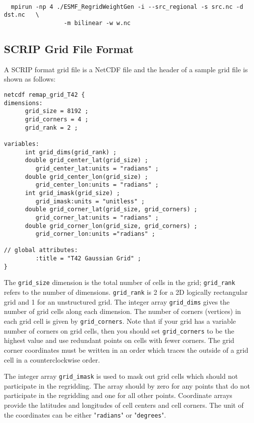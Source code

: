\begin{verbatim}

  mpirun -np 4 ./ESMF_RegridWeightGen -i --src_regional -s src.nc -d dst.nc   \
                 -m bilinear -w w.nc

\end{verbatim}


\subsection{SCRIP Grid File Format}\label{sec:scripgridformat}

A SCRIP format grid file is a NetCDF file and the header of a sample grid file is shown as follows:

\begin{verbatim}
netcdf remap_grid_T42 {
dimensions:
      grid_size = 8192 ;
      grid_corners = 4 ;
      grid_rank = 2 ;

variables:
      int grid_dims(grid_rank) ;
      double grid_center_lat(grid_size) ;
         grid_center_lat:units = "radians" ;
      double grid_center_lon(grid_size) ;
         grid_center_lon:units = "radians" ;
      int grid_imask(grid_size) ;
         grid_imask:units = "unitless" ;
      double grid_corner_lat(grid_size, grid_corners) ;
         grid_corner_lat:units = "radians" ;
      double grid_corner_lon(grid_size, grid_corners) ;
         grid_corner_lon:units ="radians" ;

// global attributes:
         :title = "T42 Gaussian Grid" ;
}
\end{verbatim}

The {\tt grid\_size} dimension is the total number of cells in the grid; {\tt grid\_rank} refers to the
number of dimensions. {\tt grid\_rank} is 2 for a 2D logically rectangular grid and 1 for an 
unstructured grid. The integer array {\tt grid\_dims} gives the number of grid cells along each dimension. 
The number of corners (vertices) in each grid cell is given by {\tt grid\_corners}.
Note that if your grid has a variable number of corners on grid cells, then
you should set {\tt grid\_corners} to be the highest value and use redundant points
on cells with fewer corners. The grid corner coordinates must be
written in an order which traces the outside of a grid cell in a counterclockwise
order. 

The integer array {\tt grid\_imask} is used to mask out grid cells which should
not participate in the regridding. The array should by zero for any points
that do not participate in the regridding and one for all other points.
Coordinate arrays provide the latitudes and longitudes of cell centers
and cell corners. The unit of the coordinates can be either "{\tt radians}" or "{\tt degrees}". 


